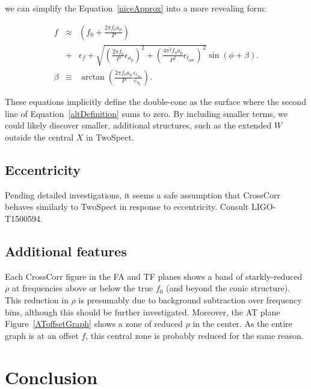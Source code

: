\documentclass{article}
\begin{document}
\noindent we can simplify the Equation~\ref{niceApprox} into a more revealing form:

\begin{eqnarray}
f &\approx& \left(f_0 + \frac{2\pi f_0 a_p}{P} \right) \nonumber\\
  &+& \epsilon_f  + \sqrt{\left(\frac{2 \pi f_0}{P} \epsilon_{a_p}\right)^2 + \left(\frac{4 \pi^2 f_0 a_p}{P^2} \epsilon_{t_\mathrm{asc}}\right)^2 } \sin \left(\phi + \beta \right). \label{altDefinition}\\
\beta &\equiv& \arctan\left(\frac{2\pi f_0 a_p}{P} \frac{\epsilon_{t_\mathrm{asc}}}{e_{a_p}} \right).
\end{eqnarray}

\noindent These equations implicitly define the double-cone as the surface where the second line of Equation~\ref{altDefinition} sums to zero.
By including smaller terms, we could likely discover smaller, additional structures, such as the extended $W$ outside the central $X$ in TwoSpect.

\subsection{Eccentricity}

Pending detailed investigations, it seems a safe assumption that CrossCorr behaves similarly to TwoSpect in response to eccentricity.
Consult LIGO-T1500594.

\subsection{Additional features}

Each CrossCorr figure in the FA and TF planes shows a band of starkly-reduced $\rho$ at frequencies above or below the true $f_0$ (and beyond the conic structure).
This reduction in $\rho$ is presumably due to background subtraction over frequency bins, although this should be further investigated.
Moreover, the AT plane Figure~\ref{AToffsetGraph} shows a zone of reduced $\rho$ in the center.
As the entire graph is at an offset $f$, this central zone is probably reduced for the same reason.

\section{Conclusion}
\end{document}
